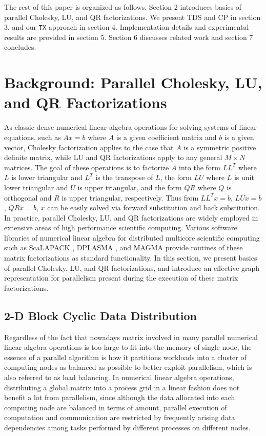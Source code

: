 \documentclass[12pt]{elsarticle}
\begin{document}
The rest of this paper is organized as follows. Section 2 introduces basics of parallel Cholesky, LU, and QR factorizations. We present TDS and CP in section 3, and our \texttt{TX} approach in section 4. Implementation details and experimental results are provided in section 5. Section 6 discusses related work and section 7 concludes.


\section{Background: Parallel Cholesky, LU, and QR Factorizations}

As classic dense numerical linear algebra operations for solving systems of linear equations, such as $Ax = b$ where $A$ is a given coefficient matrix and $b$ is a given vector, Cholesky factorization applies to the case that $A$ is a symmetric positive definite matrix, while LU and QR factorizations apply to any general $M \times N$ matrices. The goal of these operations is to factorize $A$ into the form $LL^T$ where $L$ is lower triangular and $L^T$ is the transpose of $L$, the form $LU$ where $L$ is unit lower triangular and $U$ is upper triangular, and the form $QR$ where $Q$ is orthogonal and $R$ is upper triangular, respectively. Thus from $LL^Tx = b$, $LUx = b$, $QRx = b$, $x$ can be easily solved via forward substitution and back substitution. In practice, parallel Cholesky, LU, and QR factorizations are widely employed in extensive areas of high performance scientific computing. Various software libraries of numerical linear algebra for distributed multicore scientific computing such as ScaLAPACK \cite{scalapack}, DPLASMA \cite{dplasma}, and MAGMA \cite{magma} provide routines of these matrix factorizations as standard functionality. In this section, we present basics of parallel Cholesky, LU, and QR factorizations, and introduce an effective graph representation for parallelism present during the execution of these matrix factorizations.

\subsection{2-D Block Cyclic Data Distribution}

Regardless of the fact that nowadays matrix involved in many parallel numerical linear algebra operations is too large to fit into the memory of single node, the essence of a parallel algorithm is how it partitions workloads into a cluster of computing nodes as balanced as possible to better exploit parallelism, which is also referred to as load balancing. In numerical linear algebra operations, distributing a global matrix into a process grid in a linear fashion does not benefit a lot from parallelism, since although the data allocated into each computing node are balanced in terms of amount, parallel execution of computation and communication are restricted by frequently arising data dependencies among tasks performed by different processes on different nodes.
\end{document}
